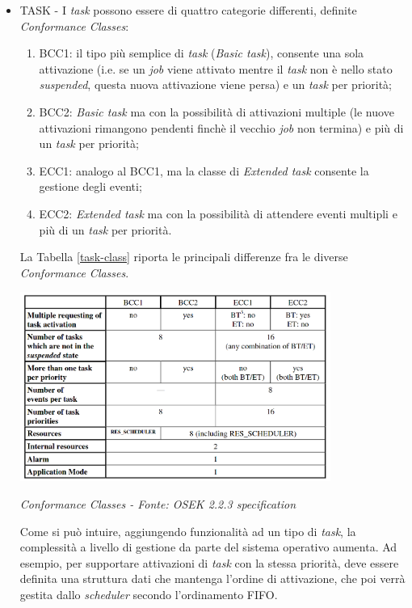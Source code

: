 \documentclass{article}
\begin{document}
\begin{itemize}
	\item TASK - I \textit{task} possono essere di quattro categorie differenti, definite \textit{Conformance Classes}:
	\begin{enumerate}
		\item BCC1: il tipo più semplice di \textit{task} (\textit{Basic task}), consente una sola attivazione (i.e. se un \textit{job} viene attivato mentre il \textit{task} non è nello stato \textit{suspended}, questa nuova attivazione viene persa) e un \textit{task} per priorità;
		\item BCC2: \textit{Basic task} ma con la possibilità di attivazioni multiple (le nuove attivazioni rimangono pendenti finchè il vecchio \textit{job} non termina) e più di un \textit{task} per priorità;
		\item ECC1: analogo al BCC1, ma la classe di \textit{Extended task} consente la gestione degli eventi;
		\item ECC2: \textit{Extended task} ma con la possibilità di attendere eventi multipli e più di un \textit{task} per priorità.
	\end{enumerate}
	La Tabella \ref{task-class} riporta le principali differenze fra le diverse \textit{Conformance Classes}.
	\begin{table}[!htbp]
		\centering
		\includegraphics[width=4in]{image/Task_ConformanceClass.png}
		\caption{\textit{\textit{Conformance Classes - Fonte: OSEK 2.2.3 specification}}}
		\label{task-class}
	\end{table}
	
	Come si può intuire, aggiungendo funzionalità ad un tipo di \textit{task}, la complessità a livello di gestione da parte del sistema operativo aumenta. Ad esempio, per supportare attivazioni di \textit{task} con la stessa priorità, deve essere definita una struttura dati che mantenga l'ordine di attivazione, che poi verrà gestita dallo \textit{scheduler} secondo l'ordinamento FIFO.
	

\end{itemize}
\end{document}
